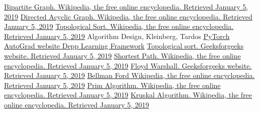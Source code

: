 \documentclass[12pt]{article}
\begin{document}
\newpage
\begin{thebibliography}{9}
\href{https://en.wikipedia.org/wiki/Bipartite\_graph}{Bipartite Graph.  Wikipedia, the free online encyclopedia. Retrieved January 5, 2019}
\href{https://en.wikipedia.org/wiki/Directed_acyclic_graph}{Directed Acyclic Graph.  Wikipedia, the free online encyclopedia. Retrieved January 5, 2019}
\href{https://en.wikipedia.org/wiki/Topological_sorting}{Topological Sort. Wikipedia, the free online encyclopedia. Retrieved January 5, 2019} 
Algorithm Design, Kleinberg, Tardos
\href{ https://pytorch.org/docs/stable/autograd.html}{PyTorch AutoGrad website Depp Learning Framework}
\href{https://www.geeksforgeeks.org/topological-sorting/}{Topological sort. Geeksforgeeks website. Retrieved January 5, 2019}
\href{https://www.wikiwand.com/en/Shortest_path_problem}{Shortest Path. Wikipedia, the free online encyclopedia. Retrieved January 5, 2019}
\href{https://www.geeksforgeeks.org/floyd-warshall-algorithm-dp-16/}{Floyd Warshall. Geeksforgeeks website. Retrieved January 5, 2019}
\href{https://en.wikipedia.org/wiki/Bellman–Ford_algorithm}{Bellman Ford Wikipedia, the free online encyclopedia. Retrieved January 5, 2019}
\href{https://www.wikiwand.com/en/Prim}{Prim Algorithm. Wikipedia, the free online encyclopedia. Retrieved January 5, 2019}
\href{https://en.wikipedia.org/wiki/Kruskal%27s_algorithm}{Kruskal Algorithm. Wikipedia, the free online encyclopedia. Retrieved January 5, 2019}

\end{thebibliography}        
\end{document}
